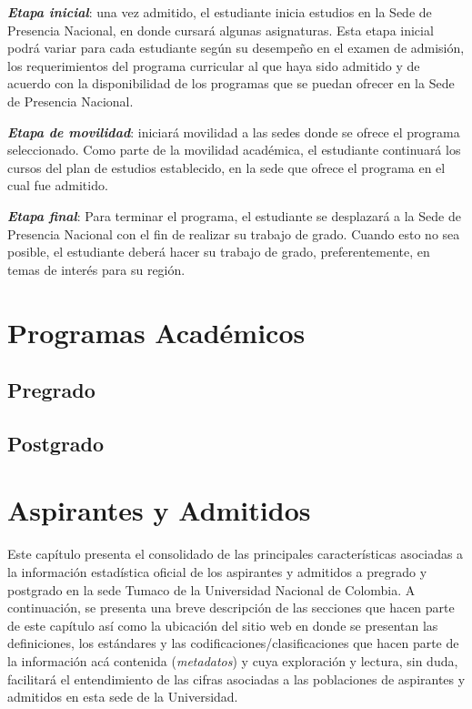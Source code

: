 \documentclass[
]{book}
\begin{document}
\emph{\textbf{Etapa inicial}}: una vez admitido, el estudiante inicia estudios en la Sede de Presencia Nacional, en donde cursará algunas asignaturas. Esta etapa inicial podrá variar para cada estudiante según su desempeño en el examen de admisión, los requerimientos del programa curricular al que haya sido admitido y de acuerdo con la disponibilidad de los programas que se puedan ofrecer en la Sede de Presencia Nacional.

\emph{\textbf{Etapa de movilidad}}: iniciará movilidad a las sedes donde se ofrece el programa seleccionado. Como parte de la movilidad académica, el estudiante continuará los cursos del plan de estudios establecido, en la sede que ofrece el programa en el cual fue admitido.

\emph{\textbf{Etapa final}}: Para terminar el programa, el estudiante se desplazará a la Sede de Presencia Nacional con el fin de realizar su trabajo de grado. Cuando esto no sea posible, el estudiante deberá hacer su trabajo de grado, preferentemente, en temas de interés para su región.

\hypertarget{Prog}{%
\chapter{Programas Académicos}\label{Prog}}

\hypertarget{pregrado}{%
\section{Pregrado}\label{pregrado}}

\hypertarget{postgrado}{%
\section{Postgrado}\label{postgrado}}

\hypertarget{Aspirantes}{%
\chapter{Aspirantes y Admitidos}\label{Aspirantes}}

Este capítulo presenta el consolidado de las principales características asociadas a la información estadística oficial de los aspirantes y admitidos a pregrado y postgrado en la sede Tumaco de la Universidad Nacional de Colombia. A continuación, se presenta una breve descripción de las secciones que hacen parte de este capítulo así como la ubicación del sitio web en donde se presentan las definiciones, los estándares y las codificaciones/clasificaciones que hacen parte de la información acá contenida (\emph{metadatos}) y cuya exploración y lectura, sin duda, facilitará el entendimiento de las cifras asociadas a las poblaciones de aspirantes y admitidos en esta sede de la Universidad.
\end{document}
